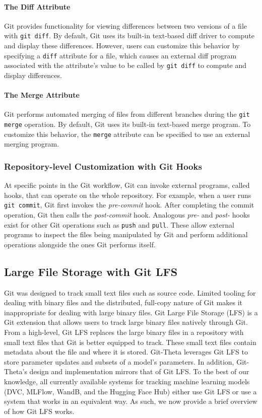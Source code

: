 \documentclass[nohyperref]{article}
\def\code#1{\texttt{#1}}
\theoremstyle{plain}
\theoremstyle{definition}
\theoremstyle{remark}
\begin{document}
\paragraph{The Diff Attribute}
Git provides functionality for viewing differences between two versions of a file with \code{git diff}. By default, Git uses its built-in text-based diff driver to compute and display these differences. However, users can customize this behavior by specifying a \code{diff} attribute for a file, which causes an external diff program associated with the attribute's value to be called by \code{git diff} to compute and display differences.

\paragraph{The Merge Attribute}
Git performs automated merging of files from different branches during the \code{git merge} operation. By default, Git uses its built-in text-based merge program. To customize this behavior, the \code{merge} attribute can be specified to use an external merging program.

\subsubsection{Repository-level Customization with Git Hooks}
At specific points in the Git workflow, Git can invoke external programs, called hooks, that can operate on the whole repository. For example, when a user runs \code{git commit}, Git first invokes the \emph{pre-commit} hook. After completing the commit operation, Git then calls the \emph{post-commit} hook. Analogous \emph{pre-} and \emph{post-} hooks exist for other Git operations such as \code{push} and \code{pull}. These allow external programs to inspect the files being manipulated by Git and perform additional operations alongside the ones Git performs itself.

\subsection{Large File Storage with Git LFS} \label{ssec:git_lfs}
Git was designed to track small text files such as source code. Limited tooling for dealing with binary files and the distributed, full-copy nature of Git makes it inappropriate for dealing with large binary files. Git Large File Storage (LFS) is a Git extension that allows users to track large binary files natively through Git. 
From a high-level, Git LFS replaces the large binary files in a repository with small text files that Git is better equipped to track. These small text files contain metadata about the file and where it is stored. Git-Theta leverages Git LFS to store parameter updates and subsets of a model's parameters. In addition, Git-Theta's design and implementation mirrors that of Git LFS. To the best of our knowledge, all currently available systems for tracking machine learning models (DVC, MLFlow, WandB, and the Hugging Face Hub) either use Git LFS or use a system that works in an equivalent way. As such, we now provide a brief overview of how Git LFS works.
\end{document}
